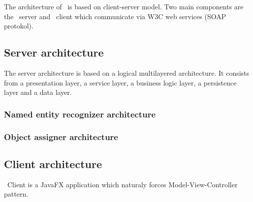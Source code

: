 

The architecture of \textan\ is based on client-server model. Two main components
are the \textan\ server and \textan\ client which communicate via W3C web services
(SOAP protokol).

\subsection{Server architecture}

The server architecture is based on a logical multilayered architecture. It
consists from a presentation layer, a service layer, a business logic layer, 
a persistence layer and a data layer.




\subsubsection{Named entity recognizer architecture}


\subsubsection{Object assigner architecture} %


\subsection{Client architecture}


\textan\ Client is a JavaFX application which naturaly forces Model-View-Controller
pattern.

